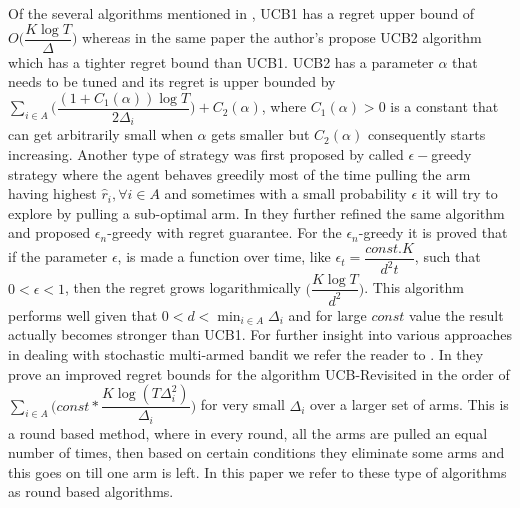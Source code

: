 	Of the several algorithms mentioned in \cite{auer2002finite}, UCB1 has a regret upper bound of \\$O\bigg(\dfrac{K\log T}{\Delta}\bigg)$ whereas in the same paper the author's propose UCB2 algorithm which has a tighter regret bound than UCB1. UCB2 has a parameter $\alpha$ that needs to be tuned and its regret is upper bounded by $\sum_{i\in A}\bigg(\dfrac{(1+C_{1}(\alpha))\log T}{2\Delta_{i}}\bigg) + C_{2}(\alpha)$, where $C_{1}(\alpha)>0$ is a constant that can get arbitrarily small when $\alpha$ gets smaller but $C_{2}(\alpha)$ consequently starts increasing. Another type of strategy was first proposed by \cite{sutton1998reinforcement} called $\epsilon-$greedy strategy where the agent behaves greedily most of the time pulling the arm having highest $\hat{r}_{i},\forall i\in A$ and sometimes with a small probability $\epsilon$ it will try to explore by pulling a sub-optimal arm. In \cite{auer2002finite} they further  refined the same algorithm and proposed $\epsilon_{n}$-greedy with regret guarantee. For the 
$\epsilon_{n}$-greedy it is  proved that if the parameter $\epsilon$, is made a function over time, like $\epsilon_{t}=\dfrac{const.K}{d^{2}t}$, such that $0<\epsilon<1$, then the regret grows logarithmically $\bigg(\dfrac{K\log T}{d^{2}}\bigg)$. This algorithm performs well given that $0<d<\min_{i\in A}{\Delta_{i}}$ and for large $const$ value the result actually becomes stronger than UCB1. For further insight into various approaches in dealing with stochastic multi-armed bandit we refer the reader to \cite{bubeck2012regret}. In \cite{auer2010ucb} they prove an improved regret bounds for the algorithm UCB-Revisited in the order of $\sum_{i\in A}\bigg(const*\dfrac{K\log (T\Delta_{i}^{2})}{\Delta_{i}}\bigg)$ for very small $\Delta_{i}$ over a larger set of arms. This is a round based method, where in every round, all the arms are pulled an equal number of times, then based on certain conditions they eliminate some arms and this goes on till one arm is left. In this paper we refer to these type of algorithms 
as round based algorithms.
	

